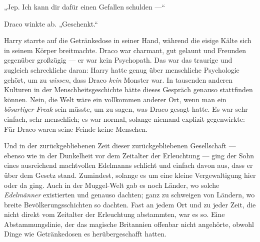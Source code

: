 „Jep. Ich kann dir dafür einen Gefallen schulden —“

Draco winkte ab.
„Geschenkt.“

Harry starrte auf die Getränkedose in seiner Hand, während die eisige Kälte sich in seinem Körper breitmachte. Draco war charmant, gut gelaunt und Freunden gegenüber großzügig — er war kein Psychopath. Das war das traurige und zugleich schreckliche daran: Harry hatte genug über menschliche Psychologie gehört, um zu \emph{wissen}, dass Draco \emph{kein} Monster war. In tausenden anderen Kulturen in der Menschheitsgeschichte hätte dieses Gespräch genauso stattfinden können. Nein, die Welt wäre ein vollkommen anderer Ort, wenn man ein \emph{bösartiger Freak} sein müsste, um zu sagen, was Draco gesagt hatte. Es war sehr einfach, sehr menschlich; es war normal, solange niemand explizit gegenwirkte: Für Draco waren seine Feinde keine Menschen.

Und in der zurückgebliebenen Zeit dieser zurückgebliebenen Gesellschaft — ebenso wie in der Dunkelheit vor dem Zeitalter der Erleuchtung — ging der Sohn eines ausreichend machtvollen Edelmanns schlicht und einfach davon aus, dass er über dem Gesetz stand. Zumindest, solange es um eine kleine Vergewaltigung hier oder da ging. Auch in der Muggel-Welt gab es noch Länder, wo solche \emph{Edelmänner} existierten und genauso dachten; ganz zu schweigen von Ländern, wo breite Bevölkerungsschichten so dachten. Fast an jedem Ort und zu jeder Zeit, die nicht direkt vom Zeitalter der Erleuchtung abstammten, war es so. Eine Abstammungslinie, der das magische Britannien offenbar nicht angehörte, obwohl Dinge wie Getränkedosen es herübergeschafft hatten.

